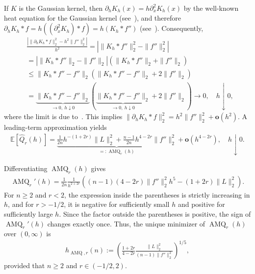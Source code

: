 If $K$ is the Gaussian kernel, then $\partial_hK_h(x)=h\partial_x^2K_h(x)$ by the well-known heat equation for the Gaussian kernel (see~\cite[Section~2.3.1]{evans2022partial}), and therefore $\partial_hK_h\ast f=h((\partial_x^2K_h)\ast f)=h(K_h\ast f'')$ (see~\cite[Theorem~7.19]{rudin_functional_1991}). Consequently,
\begin{align*}
    &\frac{|\|\partial_hK_h\ast f\|_2^2-h^2\|f''\|_2^2|}{h^2}=|\|K_h\ast f''\|_2^2-\|f''\|_2^2|\\&
    =|\|K_h\ast f''\|_2-\|f''\|_2|(\|K_h\ast f''\|_2+\|f''\|_2)
    \\&
    \le\|K_h\ast f''-f''\|_2(\|K_h\ast f''-f''\|_2+2\|f''\|_2)
    \\&
    =\underbrace{\|K_h\ast f''-f''\|_2}_{\to0,\ h\downarrow0}(\underbrace{\|K_h\ast f''-f''\|_2}_{\to0,\ h\downarrow0}+2\|f''\|_2)\to0,\quad h\downarrow0,
\end{align*}
where the limit is due to~\cite[Theorem~8.14]{folland_real_1999}. This implies $\|\partial_hK_h\ast f\|_2^2=h^2\|f''\|_2^2+\mathbf{o}(h^2)$. A leading-term approximation yields
\begin{align*}
    \mathbb{E}[\hat{Q}_r(h)]=\underbrace{\frac{1}{2n}h^{-(1+2r)}\|L\|_2^2+\frac{n-1}{2n}h^{4-2r}\|f''\|_2^2}_{=:\operatorname{AMQ}_r(h)}+\mathbf{o}(h^{4-2r}),\quad h\downarrow0.
\end{align*}

Differentiating $\operatorname{AMQ}_r(h)$ gives
\begin{align*}
    \operatorname{AMQ}_r'(h)=\frac{1}{2n}\frac{1}{h^{2+2r}}\left((n-1)(4-2r)\|f''\|_2^2h^5-(1+2r)\|L\|_2^2\right).
\end{align*}
For $n\ge2$ and $r<2$, the expression inside the parentheses is strictly increasing in $h$, and for $r>-1/2$, it is negative for sufficiently small $h$ and positive for sufficiently large $h$. Since the factor outside the parentheses is positive, the sign of $\operatorname{AMQ}_r'(h)$ changes exactly once. Thus, the unique minimizer of $\operatorname{AMQ}_r(h)$ over $(0,\infty)$ is
\begin{align*}
    h_{\operatorname{AMQ},r}(n):=\left(\frac{1+2r}{4-2r}\frac{\|L\|_2^2}{(n-1)\|f''\|_2^2}\right)^{1/5},
\end{align*}
provided that $n\ge2$ and $r\in(-1/2,2)$.

